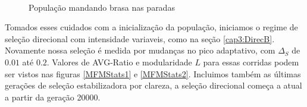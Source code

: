 \begin{center}
\begin{figure}[htbp]
      \\
      \caption{População mandando brasa nas paradas}
      \label{varBurnin}
   \end{figure}
\end{center}

Tomados esses cuidados com a inicialização da população, iniciamos o
regime de seleção direcional com intensidade variaveis, como na seção
\ref{cap3:DirecB}. 
Novamente nossa seleção é medida por mudanças no pico adaptativo, com
$\Delta_S$ de $0.01$ até $0.2$. 
Valores de AVG-Ratio e modularidade $L$ para essas corridas podem ser
vistos nas figuras \ref{MFMStats1} e \ref{MFMStats2}. 
Incluimos também as últimas gerações de seleção estabilizadora por
clareza, a seleção direcional começa a atual a partir da geração 20000.  



